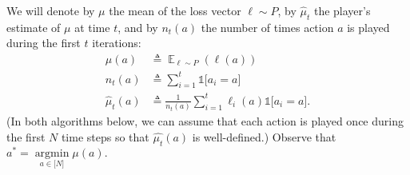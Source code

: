 \documentclass[11pt]{article}
\newcommand{\bN}{\lbrack N \rbrack}
\newcommand{\E}{\mathop{{}\mathbb{E}}}
\DeclareMathOperator*{\argmin}{argmin}
\begin{document}
We will denote by $\mu$ the mean of the loss vector $\ell\sim P$, by $\hat{\mu}_t$ the player's estimate of $\mu$ at time $t$, and by $n_t(a)$ the number of times action $a$ is played during the first $t$ iterations:
\begin{align*} \mu(a) &\triangleq \E_{\ell \sim P}\left(\ell(a)\right)\\
n_t(a) &\triangleq \sum_{i=1}^t \mathds{1} \lbrack a_i = a \rbrack\\
\hat{\mu}_t(a) &\triangleq \frac{1}{n_t(a)} \sum_{i=1}^t \ell_i(a) \mathds{1} \lbrack a_i = a \rbrack.
\end{align*} 
(In both algorithms below, we can assume that each action is played once during the first $N$ time steps so that $\hat{\mu_t}(a)$ is well-defined.) Observe that $a^*=\argmin\limits_{a \in \bN} \mu(a).$
\end{document}
